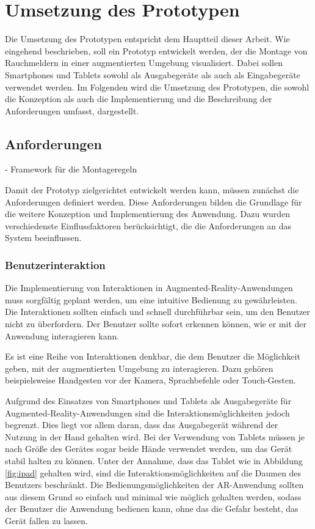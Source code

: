 \chapter{Umsetzung des Prototypen}

Die Umsetzung des Prototypen entspricht dem Hauptteil dieser Arbeit. Wie eingehend beschrieben, soll ein Prototyp entwickelt werden, der die Montage von Rauchmeldern in einer augmentierten Umgebung visualisiert. Dabei sollen Smartphones und Tablets sowohl als Ausgabegeräte als auch als Eingabegeräte verwendet werden. Im Folgenden wird die Umsetzung des Prototypen, die sowohl die Konzeption als auch die Implementierung  und die Beschreibung der Anforderungen umfasst, dargestellt.

\section{Anforderungen}

- Framework für die Montageregeln

Damit der Prototyp zielgerichtet entwickelt werden kann, müssen zunächst die Anforderungen definiert werden. Diese Anforderungen bilden die Grundlage für die weitere Konzeption und Implementierung des Anwendung. Dazu wurden verschiedenste Einflussfaktoren berücksichtigt, die die Anforderungen an das System beeinflussen.

\subsection{Benutzerinteraktion}

Die Implementierung von Interaktionen in Augmented-Reality-Anwendungen muss sorgfältig geplant werden, um eine intuitive Bedienung zu gewährleisten. Die Interaktionen sollten einfach und schnell durchführbar sein, um den Benutzer nicht zu überfordern. Der Benutzer sollte sofort erkennen können, wie er mit der Anwendung interagieren kann. 

Es ist eine Reihe von Interaktionen denkbar, die dem Benutzer die Möglichkeit geben, mit der augmentierten Umgebung zu interagieren. Dazu gehören beispielsweise Handgesten vor der Kamera, Sprachbefehle oder Touch-Gesten. 

Aufgrund des Einsatzes von Smartphones und Tablets als Ausgabegeräte für Augmented-Reality-Anwendungen sind die Interaktionsmöglichkeiten jedoch begrenzt. Dies liegt vor allem daran, dass das Ausgabegerät während der Nutzung in der Hand gehalten wird. Bei der Verwendung von Tablets müssen je nach Größe des Gerätes sogar beide Hände verwendet werden, um das Gerät stabil halten zu können. Unter der Annahme, dass das Tablet wie in Abbildung \ref{fig:ipad} gehalten wird, sind die Interaktionsmöglichkeiten auf die Daumen des Benutzers beschränkt. Die Bedienungsmöglichkeiten der AR-Anwendung sollten aus diesem Grund so einfach und minimal wie möglich gehalten werden, sodass der Benutzer die Anwendung bedienen kann, ohne das die Gefahr besteht, das Gerät fallen zu lassen.

